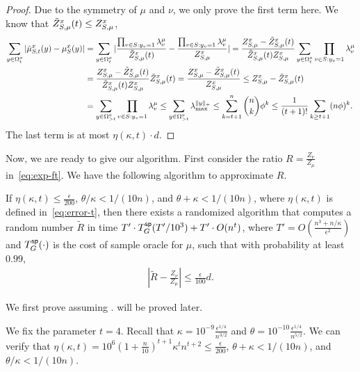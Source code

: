 \begin{proof}
Due to the symmetry of $\mu$ and $\nu$, we only prove the first term here. We know that $\tilde{Z}_{S,\mu}^x (t)\leq Z_{S,\mu}^x$,
\begin{align*}
    \sum_{y \in \Omega^x_t} \vert \tilde{\mu}_{S,t}^x(y) - \mu^x_S(y) \vert&=\sum_{y \in \Omega^x_t} \vert \frac{\prod_{v\in S:y_v=1}\lambda_v^\mu}{\tilde{Z}_{S,\mu}^x (t)} - \frac{\prod_{v\in S:y_v=1}\lambda_v^\mu}{Z_{S,\mu}^x} \vert =\frac{Z_{S,\mu}^x-\tilde{Z}_{S,\mu}^x (t)}{\tilde{Z}_{S,\mu}^x (t) Z_{S,\mu}^x}\sum_{y \in \Omega^x_t}\prod_{v\in S:y_v=1}\lambda_v^\mu\\
    &=\frac{Z_{S,\mu}^x-\tilde{Z}_{S,\mu}^x (t)}{\tilde{Z}_{S,\mu}^x (t) Z_{S,\mu}^x}\tilde{Z}_{S,\mu}^x (t)=\frac{Z_{S,\mu}^x-\tilde{Z}_{S,\mu}^x (t)}{Z_{S,\mu}^x}\leq Z_{S,\mu}^x-\tilde{Z}_{S,\mu}^x (t)\\
    &=\sum_{y\in \Omega_{>t}^x}\prod_{v\in S:y_v=1}\lambda_v^\mu\leq \sum_{y\in \Omega_{>t}^x}\lambda_{\max}^{\Vert y \Vert_+}\leq \sum_{k=t+1}^n\binom{n}{k}\phi^k\leq \frac{1}{(t+1)!}\sum_{k\geq t+1}(n\phi)^k.
\end{align*}
The last term is at most $\eta(\kappa,t) \cdot d$.
\end{proof}




Now, we are ready to give our algorithm.
First consider the ratio $R = \frac{Z_\nu}{Z_\mu}$ in~\eqref{eq:exp-ft}. We have the following algorithm to approximate $R$. 

\begin{lemma}\label{lem:alg-ratio}
If $\eta(\kappa,t)\leq \frac{\epsilon}{200}$, $\theta/\kappa < 1/(10n)$, and $\theta + \kappa < 1/(10n)$, where $\eta(\kappa,t)$ is defined in~\eqref{eq:error-t}, then there exists a randomized algorithm that computes a random number $\tilde{R}$ in time $T' \cdot T^{\textsf{sp}}_G(T'/10^3) + T' \cdot O(n^t)$, where $T'=O(\frac{n^3 + n/\kappa}{\epsilon^2})$ and $T^{\textsf{sp}}_G(\cdot)$ is the cost of sample oracle for $\mu$, such that with probability at least $0.99$,
\begin{align}\label{eq:tildeR}
   \left\vert \tilde{R} - \frac{Z_\nu}{Z_\mu} \right\vert \leq \frac{\epsilon}{100} d.
\end{align}
\end{lemma}

We first prove  assuming .  will be proved later.


We fix the parameter $t = 4$. 
Recall that $\kappa = 10^{-9}\frac{\epsilon^{1/4}}{n^{3/2}}$ and $\theta = 10^{-10}\frac{\epsilon^{1/4}}{n^{5/2}}$.
We can verify that $\eta(\kappa,t) = 10^6\left(1+\frac{n}{10}\right)^{t+1} \kappa^t n^{t+2} \leq \frac{\epsilon}{200}$, $\theta + \kappa < 1/ (10n)$, and $\theta / \kappa < 1/(10n)$.

